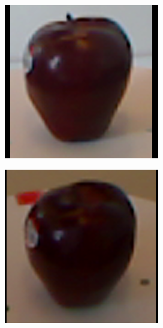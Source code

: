 \begin{figure}
	\centering
	\begin{subfigure}[b]{0.3\linewidth}
	    \includegraphics[width=\textwidth]{images/apple_1_1_1_crop.png}
    	\caption{}
	\end{subfigure}
    \begin{subfigure}[b]{0.3\linewidth}
	    \includegraphics[width=\textwidth]{images/apple_1_2_1_crop.png}

\end{subfigure}
\end{figure}
